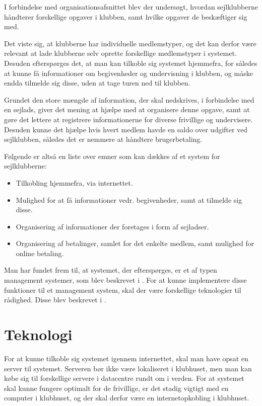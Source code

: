 I forbindelse med organisationsafsnittet blev der undersøgt, hvordan sejlklubberne håndterer forskellige
opgaver i klubben, samt hvilke opgaver de beskæftiger sig med.

Det viste sig, at klubberne har individuelle medlemstyper, og det kan derfor være relevant at lade klubberne
selv oprette forskellige medlemstyper i systemet. Desuden efterspørges det, at man kan tilkoble sig systemet
hjemmefra, for således at kunne få informationer om begivenheder og undervisning i klubben, og måske endda
tilmelde sig disse, uden at tage turen ned til klubben.

Grundet den store mængde af information, der skal nedskrives, i forbindelse med en sejlads, giver det mening at
hjælpe med at organisere denne opgave, samt at gøre det lettere at registrere informationerne for diverse
frivillige og undervisere. Desuden kunne det hjælpe hvis hvert medlem havde en saldo over udgifter ved sejlklubben, således
det er nemmere at håndtere brugerbetaling.

Følgende er altså en liste over emner som kan dækkes af et system for sejlklubberne:

\begin{itemize}
  \item Tilkobling hjemmefra, via internettet.
  \item Mulighed for at få informationer vedr. begivenheder, samt at tilmelde sig disse.
  \item Organisering af informationer der foretages i form af sejladser.
  \item Organisering af betalinger, samlet for det enkelte medlem, samt mulighed for online betaling.
\end{itemize}

Man har fundet frem til, at systemet, der efterspørges, er et af typen management systemer, som blev beskrevet i
. For at kunne implementere disse funktioner til et
management system, skal der være forskellige teknologier til rådighed. Disse blev beskrevet i
.


\section{Teknologi}

For at kunne tilkoble sig systemet igennem internettet, skal man have opsat en server til systemet. Serveren
bør ikke være lokaliseret i klubhuset, men man kan købe sig til forskellige servere i datacentre rundt om i
verden. For at systemet skal kunne fungere optimalt for de frivillige, er det stadig vigtigt med en computer i
klubhuset, og der skal derfor være en internetopkobling i klubhuset.

